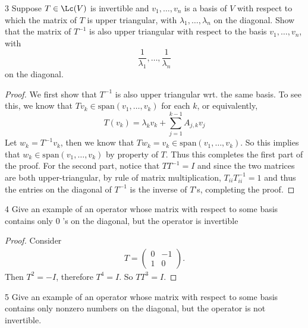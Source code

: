 \documentclass{extarticle}
\begin{document}
\begin{problem}{3}
    Suppose \(T \in \Lc(V)\) is invertible and \(v_1, \ldots, v_n\) is a basis of \(V\) with respect 
    to which the matrix of \(T\) is upper triangular, with \(\lambda_1, \ldots, \lambda_n\) on the 
    diagonal. Show that the matrix of \(T^{-1}\) is also upper triangular with respect to the basis 
    \(v_1, \ldots, v_n\), with 
    \[\frac{1}{\lambda_1}, \ldots, \frac{1}{\lambda_n}\]
    on the diagonal. 
\end{problem}

\begin{proof}
We first show that \(T^{-1}\) is also upper triangular wrt. the same basis. To see this, we know 
that \(T v_k \in \text{span}(v_1, \ldots, v_k)\) for each \(k\), or equivalently, 
\[T(v_k) = \lambda_k v_k + \sum_{j=1}^{k-1}A_{j,k}v_j\]
Let \(w_k = T^{-1}v_k\), then we know that \(T w_k = v_k \in \text{span}(v_1, \ldots, v_k)\). So this 
implies that \(w_k \in \text{span}(v_1, \ldots, v_k)\) by property of \(T\). Thus this completes the 
first part of the proof. For the second part, notice that \(TT^{-1} = I\) and since the two matrices 
are both upper-triangular, by rule of matrix multiplication, \(T_{ii} T^{-1}_{ii} = 1\) and thus 
the entries on the diagonal of \(T^{-1}\) is the inverse of \(T\)'s, completing the proof.  
\end{proof}

\begin{problem}{4}
   Give an example of an operator whose matrix with respect to some basis
contains only 0 ’s on the diagonal, but the operator is invertible 
\end{problem}

\begin{proof}
    Consider 
\begin{gather*}
    T =
    \begin{pmatrix}
        0 & -1 \\ 
        1 & 0
    \end{pmatrix}.
\end{gather*}
Then $ T^{2} = - I $, therefore $ T^4 = I $. So $ T T^{3} = I $.
\end{proof}

\begin{problem}{5}
Give an example of an operator whose matrix with respect to some basis
contains only nonzero numbers on the diagonal, but the operator is not
invertible.
\end{problem}
\end{document}
